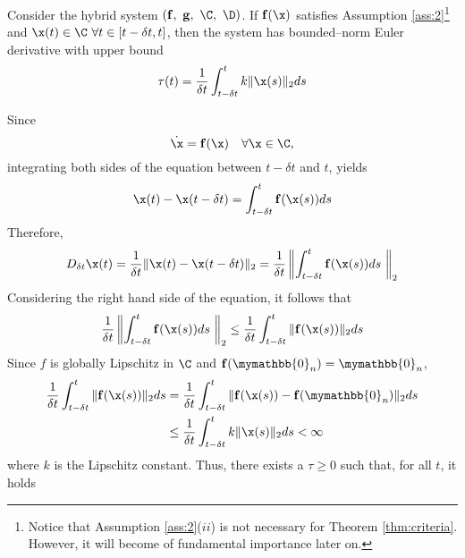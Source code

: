 \begin{thm}\label{thm:criteria}
   	Consider the hybrid system
   	$(\mathbf{\mathbf{f}},~\mathbf{g},~\C,~\D)$. If $\mathbf{\mathbf{f}}(\x)$ satisfies
   	Assumption \ref{ass:2}\footnote{Notice that Assumption \ref{ass:2}($ii$) is
   	not necessary for Theorem \ref{thm:criteria}. However, it will become of fundamental
   	importance later on.} and $\x(t)\in \C ~\forall t \in [t-\delta t,t]$,
   	then the system has bounded--norm Euler derivative with upper bound
	\begin{equation}\label{eq:bound}
		\tau(t)=\frac{1}{\delta t}\int_{t-\delta t}^{t}k\|\x(s)\|_2ds
	\end{equation}
\end{thm}
%
\proof
    Since
    \begin{equation}
        \dot{\x} = \mathbf{\mathbf{f}}(\x)\quad\forall\x\in\C, 
    \end{equation}
    integrating both sides of the equation between $t-\delta t$ and $t$, yields
    \begin{equation}
        \x(t)-\x(t-\delta t) = \int_{t-\delta t}^{t}\mathbf{\mathbf{f}}(\x(s))ds
    \end{equation}
    Therefore,
    \begin{equation}%
	    D_{\delta t}\x(t)=\frac{1}{\delta t}\|\x(t)-\x(t-\delta t)\|_2 = \frac{1}{\delta t}\left\lVert\int_{t-\delta t}^{t}\mathbf{\mathbf{f}}(\x(s))ds~\right\rVert_2
    \end{equation}
    Considering the right hand side of the equation, it follows that
    \begin{equation}
        \frac{1}{\delta t}\left\lVert\int_{t-\delta t}^{t}\mathbf{\mathbf{f}}(\x(s))ds~\right\rVert_2\leq\frac{1}{\delta t}\int_{t-\delta t}^{t}\|\mathbf{\mathbf{f}}(\x(s))\|_2ds
    \end{equation}
    Since $f$ is globally Lipschitz in $\C$ and $\mathbf{\mathbf{f}}(\mymathbb{0}_n) = \mymathbb{0}_n$,
    \begin{align}
	    \frac{1}{\delta t}\int_{t-\delta t}^{t}\|\mathbf{\mathbf{f}}(\x(s))\|_2ds &= \frac{1}{\delta t}\int_{t-\delta t}^{t}\|\mathbf{\mathbf{f}}(\x(s))-\mathbf{\mathbf{f}}(\mymathbb{0}_n)\|_2ds\\
	    &\leq\frac{1}{\delta t}\int_{t-\delta t}^{t}k\|\x(s)\|_2ds<\infty
    \end{align}
    where $k$ is the Lipschitz constant. Thus, there exists a $\tau\geq 0$ such that, for all $t$, it holds
